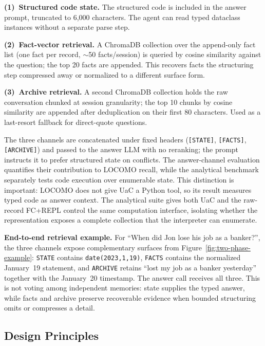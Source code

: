 \documentclass[letterpaper]{article} %
\begin{document}
\textbf{(1)~Structured code state.} The structured code is included in the answer prompt, truncated to 6{,}000 characters. The agent can read typed dataclass instances without a separate parse step.

\textbf{(2)~Fact-vector retrieval.} A ChromaDB collection over the append-only fact list (one fact per record, $\sim$50 facts/session) is queried by cosine similarity against the question; the top 20 facts are appended. This recovers facts the structuring step compressed away or normalized to a different surface form.

\textbf{(3)~Archive retrieval.} A second ChromaDB collection holds the raw conversation chunked at session granularity; the top 10 chunks by cosine similarity are appended after deduplication on their first 80 characters. Used as a last-resort fallback for direct-quote questions.

The three channels are concatenated under fixed headers (\texttt{[STATE]}, \texttt{[FACTS]}, \texttt{[ARCHIVE]}) and passed to the answer LLM with no reranking; the prompt instructs it to prefer structured state on conflicts. The answer-channel evaluation quantifies their contribution to LOCOMO recall, while the analytical benchmark separately tests code execution over enumerable state. This distinction is important: LOCOMO does not give UaC a Python tool, so its result measures typed code as answer context. The analytical suite gives both UaC and the raw-record FC+REPL control the same computation interface, isolating whether the representation exposes a complete collection that the interpreter can enumerate.

\textbf{End-to-end retrieval example.} For ``When did Jon lose his job as a banker?'', the three channels expose complementary surfaces from Figure~\ref{fig:two-phase-example}: \texttt{STATE} contains \texttt{date(2023,1,19)}, \texttt{FACTS} contains the normalized January~19 statement, and \texttt{ARCHIVE} retains ``lost my job as a banker yesterday'' together with the January~20 timestamp. The answer call receives all three. This is not voting among independent memories: state supplies the typed answer, while facts and archive preserve recoverable evidence when bounded structuring omits or compresses a detail.

\subsection{Design Principles}
\label{sec:principles}
\end{document}
